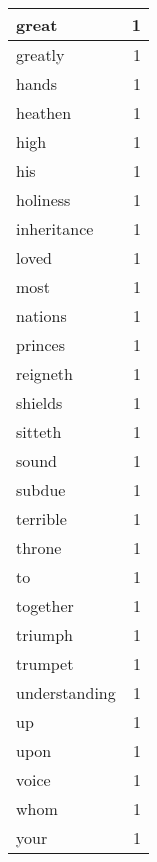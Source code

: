 \begin{center}
\begin{longtable}{l|r}
great & 1 \\ \hline
greatly & 1 \\ \hline
hands & 1 \\ \hline
heathen & 1 \\ \hline
high & 1 \\ \hline
his & 1 \\ \hline
holiness & 1 \\ \hline
inheritance & 1 \\ \hline
loved & 1 \\ \hline
most & 1 \\ \hline
nations & 1 \\ \hline
princes & 1 \\ \hline
reigneth & 1 \\ \hline
shields & 1 \\ \hline
sitteth & 1 \\ \hline
sound & 1 \\ \hline
subdue & 1 \\ \hline
terrible & 1 \\ \hline
throne & 1 \\ \hline
to & 1 \\ \hline
together & 1 \\ \hline
triumph & 1 \\ \hline
trumpet & 1 \\ \hline
understanding & 1 \\ \hline
up & 1 \\ \hline
upon & 1 \\ \hline
voice & 1 \\ \hline
whom & 1 \\ \hline
your & 1 \\ \hline
\end{longtable}
\end{center}



\normalsize